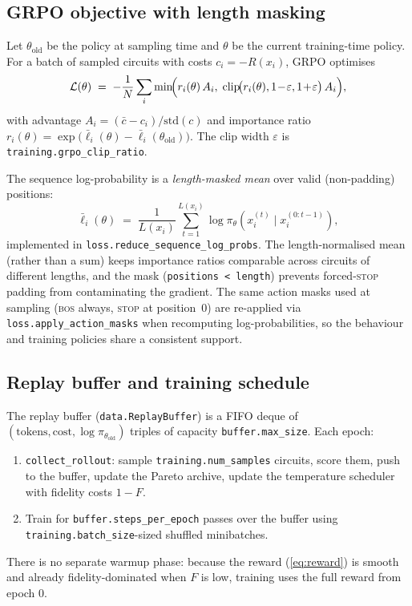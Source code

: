 \documentclass[11pt]{article}
\begin{document}
\subsection{GRPO objective with length masking}
\label{sec:grpo}

Let $\theta_{\mathrm{old}}$ be the policy at sampling time and $\theta$ be the
current training-time policy. For a batch of sampled circuits with costs
$c_i = -R(x_i)$, GRPO optimises
\begin{equation}
  \mathcal{L}(\theta) \;=\; -\frac{1}{N}\sum_i \min\!\Bigl(
    r_i(\theta)\,A_i,\;
    \mathrm{clip}\!\bigl(r_i(\theta),1\!-\!\varepsilon,1\!+\!\varepsilon\bigr)\,A_i
  \Bigr),
\end{equation}
with advantage $A_i = (\bar{c} - c_i)/\mathrm{std}(c)$ and importance ratio
$r_i(\theta) = \exp\!\bigl(\bar{\ell}_i(\theta) - \bar{\ell}_i(\theta_{
\mathrm{old}})\bigr)$. The clip width $\varepsilon$ is
\texttt{training.grpo\_clip\_ratio}.

The sequence log-probability is a \emph{length-masked mean} over valid
(non-padding) positions:
\begin{equation}
  \bar{\ell}_i(\theta) \;=\; \frac{1}{L(x_i)} \sum_{t=1}^{L(x_i)}
  \log \pi_\theta(x_i^{(t)} \mid x_i^{(0:t-1)}),
  \label{eq:length-mean}
\end{equation}
implemented in \texttt{loss.reduce\_sequence\_log\_probs}. The
length-normalised mean (rather than a sum) keeps importance ratios
comparable across circuits of different lengths, and the mask
(\texttt{positions < length}) prevents forced-\textsc{stop} padding from
contaminating the gradient. The same action masks used at sampling
(\textsc{bos} always, \textsc{stop} at position~0) are re-applied via
\texttt{loss.apply\_action\_masks} when recomputing log-probabilities, so
the behaviour and training policies share a consistent support.

\subsection{Replay buffer and training schedule}

The replay buffer (\texttt{data.ReplayBuffer}) is a FIFO deque of
$(\text{tokens}, \text{cost}, \log\pi_{\theta_{\mathrm{old}}})$ triples of
capacity \texttt{buffer.max\_size}. Each epoch:
\begin{enumerate}[leftmargin=1.8em]
  \item \texttt{collect\_rollout}: sample \texttt{training.num\_samples}
  circuits, score them, push to the buffer, update the Pareto archive,
  update the temperature scheduler with fidelity costs $1-F$.
  \item Train for \texttt{buffer.steps\_per\_epoch} passes over the buffer
  using \texttt{training.batch\_size}-sized shuffled minibatches.
\end{enumerate}
There is no separate warmup phase: because the reward (\ref{eq:reward}) is
smooth and already fidelity-dominated when $F$ is low, training uses the
full reward from epoch $0$.
\end{document}
